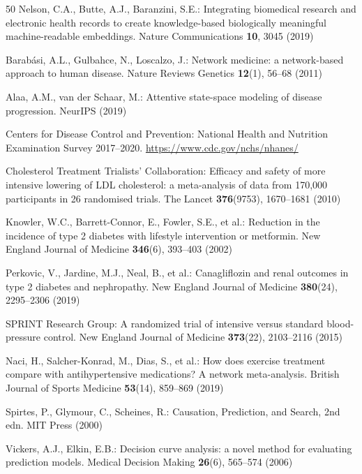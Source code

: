 \documentclass[runningheads]{llncs}
\begin{document}
\begin{thebibliography}{50}
Nelson, C.A., Butte, A.J., Baranzini, S.E.:
Integrating biomedical research and electronic health records to
create knowledge-based biologically meaningful machine-readable
embeddings.
Nature Communications \textbf{10}, 3045 (2019)

Barab\'{a}si, A.L., Gulbahce, N., Loscalzo, J.:
Network medicine: a network-based approach to human disease.
Nature Reviews Genetics \textbf{12}(1), 56--68 (2011)

Alaa, A.M., van der Schaar, M.:
Attentive state-space modeling of disease progression.
NeurIPS (2019)

Centers for Disease Control and Prevention:
National Health and Nutrition Examination Survey 2017--2020.
\url{https://www.cdc.gov/nchs/nhanes/}

Cholesterol Treatment Trialists' Collaboration:
Efficacy and safety of more intensive lowering of LDL cholesterol:
a meta-analysis of data from 170,000 participants in 26 randomised
trials.
The Lancet \textbf{376}(9753), 1670--1681 (2010)

Knowler, W.C., Barrett-Connor, E., Fowler, S.E., et al.:
Reduction in the incidence of type 2 diabetes with lifestyle
intervention or metformin.
New England Journal of Medicine \textbf{346}(6), 393--403 (2002)

Perkovic, V., Jardine, M.J., Neal, B., et al.:
Canagliflozin and renal outcomes in type 2 diabetes and nephropathy.
New England Journal of Medicine \textbf{380}(24), 2295--2306 (2019)

SPRINT Research Group:
A randomized trial of intensive versus standard blood-pressure
control.
New England Journal of Medicine \textbf{373}(22), 2103--2116 (2015)

Naci, H., Salcher-Konrad, M., Dias, S., et al.:
How does exercise treatment compare with antihypertensive medications?
A network meta-analysis.
British Journal of Sports Medicine \textbf{53}(14), 859--869 (2019)

Spirtes, P., Glymour, C., Scheines, R.:
Causation, Prediction, and Search, 2nd edn.
MIT Press (2000)

Vickers, A.J., Elkin, E.B.:
Decision curve analysis: a novel method for evaluating prediction
models.
Medical Decision Making \textbf{26}(6), 565--574 (2006)


\end{thebibliography}
\end{document}

